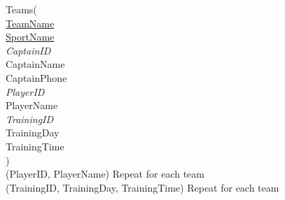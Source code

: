 \documentclass[11pt, article]{article}
\begin{document}
\begin{tabbing}
Teams( \newline \\
	\hspace{5mm}  \underline{TeamName}\\
	\hspace{5mm} \underline{SportName} \\
	\hspace{5mm} \textit{CaptainID}                      \\
	\hspace{5mm} CaptainName                 \\
	\hspace{5mm} CaptainPhone                \\
	\hspace{5mm} \textit{PlayerID}                       \\
	\hspace{5mm} PlayerName                    \\
	\hspace{5mm} \textit{TrainingID}                       \\
	\hspace{5mm} TrainingDay                     \\
	\hspace{5mm} TrainingTime                    \\
)\\
(PlayerID, PlayerName) Repeat for each team \\
(TrainingID, TrainingDay, TrainingTime) Repeat for each team
\end{tabbing}
 \newpage
\end{document}
